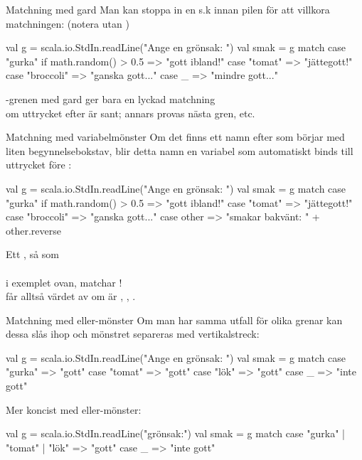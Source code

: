 \begin{Slide}{Matchning med gard}
Man kan stoppa in en s.k   innan pilen \code{=>} för att villkora matchningen: (notera  utan )
\begin{Code}
val g = scala.io.StdIn.readLine("Ange en grönsak: ")
val smak = g match 
  case "gurka" if math.random() > 0.5 => "gott ibland!"
  case "tomat" => "jättegott!"
  case "broccoli" => "ganska gott..."
  case _ => "mindre gott..."
\end{Code}
-grenen med gard ger bara en lyckad matchning \\ om uttrycket efter  är sant; annars provas nästa gren, etc.
\end{Slide}

\begin{Slide}{Matchning med variabelmönster}\SlideFontSmall
Om det finns ett namn efter  som börjar med liten begynnelsebokstav, blir detta namn en variabel som automatiskt binds till uttrycket före :

\begin{Code}
val g = scala.io.StdIn.readLine("Ange en grönsak: ")
val smak = g match 
  case "gurka" if math.random() > 0.5 => "gott ibland!"
  case "tomat" => "jättegott!"
  case "broccoli" => "ganska gott..."
  case other => "smakar bakvänt: " + other.reverse
\end{Code}

Ett  , så som \\  \\ i exemplet ovan, matchar ! \\ får alltså värdet av  om   är , , .

\end{Slide}


\begin{Slide}{Matchning med eller-mönster}\SlideFontSmall
Om man har samma utfall för olika grenar kan dessa slås ihop och mönstret separeras med vertikalstreck: \code{|}
\begin{Code}
val g = scala.io.StdIn.readLine("Ange en grönsak: ")
val smak = g match 
  case "gurka" => "gott"
  case "tomat" => "gott"
  case "lök"   => "gott"
  case _ => "inte gott"
\end{Code}

Mer koncist med eller-mönster:

\begin{Code}
val g = scala.io.StdIn.readLine("grönsak:")
val smak = g match 
  case "gurka" | "tomat" | "lök" => "gott"
  case _ => "inte gott"
\end{Code}



\end{Slide}





